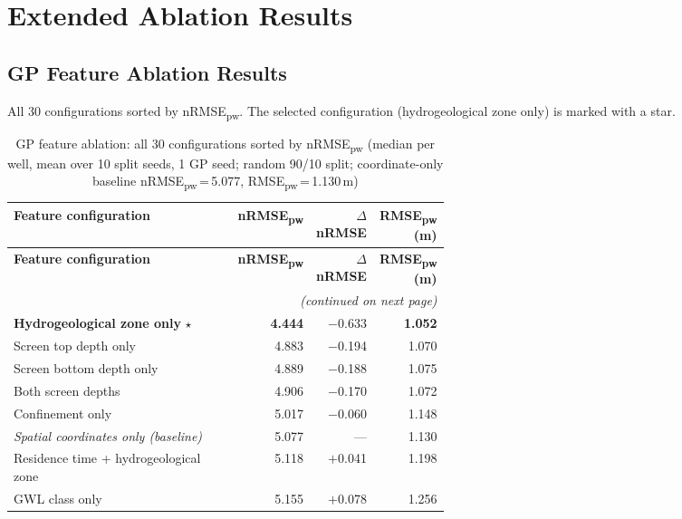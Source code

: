 \chapter{Extended Ablation Results}
\label{app:ablations}

\section{GP Feature Ablation Results}
\label{app:interp_baseline_ablation}

All 30 configurations sorted by nRMSE\textsubscript{pw}.
The selected configuration (hydrogeological zone only) is marked with a star.

\begin{longtable}{p{0.56\linewidth}rrr}
\caption{GP feature ablation: all 30 configurations sorted by
  nRMSE\textsubscript{pw} (median per well, mean over 10 split seeds, 1 GP seed; random 90/10 split;
  coordinate-only baseline nRMSE\textsubscript{pw}\,=\,5.077,
  RMSE\textsubscript{pw}\,=\,1.130\,m)}
\label{tab:gp_ablation_full}\\
\toprule
\textbf{Feature configuration} & \textbf{nRMSE\textsubscript{pw}} &
  \textbf{$\Delta$ nRMSE} & \textbf{RMSE\textsubscript{pw} (m)} \\
\midrule
\endfirsthead
\toprule
\textbf{Feature configuration} & \textbf{nRMSE\textsubscript{pw}} &
  \textbf{$\Delta$ nRMSE} & \textbf{RMSE\textsubscript{pw} (m)} \\
\midrule
\endhead
\midrule
\multicolumn{4}{r}{\footnotesize\itshape (continued on next page)}\\
\endfoot
\bottomrule
\endlastfoot
\textbf{Hydrogeological zone only} $\star$ & \textbf{4.444} & $-$0.633 & \textbf{1.052} \\
Screen top depth only                      & 4.883 & $-$0.194 & 1.070 \\
Screen bottom depth only                   & 4.889 & $-$0.188 & 1.075 \\
Both screen depths                         & 4.906 & $-$0.170 & 1.072 \\
Confinement only                           & 5.017 & $-$0.060 & 1.148 \\
\textit{Spatial coordinates only (baseline)} & 5.077 & ---    & 1.130 \\
Residence time + hydrogeological zone      & 5.118 & $+$0.041 & 1.198 \\
GWL class only                             & 5.155 & $+$0.078 & 1.256 \\

\end{longtable}
